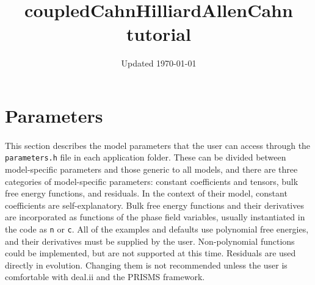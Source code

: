 \documentclass[11pt]{article}
\title{coupledCahnHilliardAllenCahn tutorial}
\date{Updated \today}
\begin{document}
\maketitle

\section{Parameters}
\paragraph{}
This section describes the model parameters that the user can access through the \texttt{parameters.h} file in each application folder.  These can be divided between model-specific parameters and those generic to all models, and there are three categories of model-specific parameters: constant coefficients and tensors, bulk free energy functions, and residuals.  In the context of their model, constant coefficients are self-explanatory.  Bulk free energy functions and their derivatives are incorporated as functions of the phase field variables, usually instantiated in the code as \texttt{n} or \texttt{c}.  All of the examples and defaults use polynomial free energies, and their derivatives must be supplied by the user.  Non-polynomial functions could be implemented, but are not supported at this time.  Residuals are used directly in evolution.  Changing them is not recommended unless the user is comfortable with deal.ii and the PRISMS framework.
\end{document}
